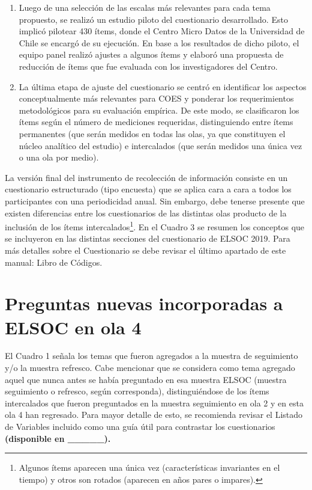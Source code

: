 \documentclass[
]{book}
\begin{document}
\begin{enumerate}
\def\labelenumi{\arabic{enumi}.}
\setcounter{enumi}{2}
\item
  Luego de una selección de las escalas más relevantes para cada tema propuesto, se realizó un estudio piloto del cuestionario desarrollado. Esto implicó pilotear 430 ítems, donde el Centro Micro Datos de la Universidad de Chile se encargó de su ejecución. En base a los resultados de dicho piloto, el equipo panel realizó ajustes a algunos ítems y elaboró una propuesta de reducción de ítems que fue evaluada con los investigadores del Centro.
\item
  La última etapa de ajuste del cuestionario se centró en identificar los aspectos conceptualmente más relevantes para COES y ponderar los requerimientos metodológicos para su evaluación empírica. De este modo, se clasificaron los ítems según el número de mediciones requeridas, distinguiendo entre ítems permanentes (que serán medidos en todas las olas, ya que constituyen el núcleo analítico del estudio) e intercalados (que serán medidos una única vez o una ola por medio).
\end{enumerate}

La versión final del instrumento de recolección de información consiste en un cuestionario estructurado (tipo encuesta) que se aplica cara a cara a todos los participantes con una periodicidad anual. Sin embargo, debe tenerse presente que existen diferencias entre los cuestionarios de las distintas olas producto de la inclusión de los ítems intercalados\footnote{Algunos ítems aparecen una única vez (características invariantes en el tiempo) y otros son rotados (aparecen
  en años pares o impares).}. En el Cuadro 3 se resumen los conceptos que se incluyeron en las distintas secciones del cuestionario de ELSOC 2019. Para más detalles sobre el Cuestionario se debe revisar el último apartado de este manual: Libro de Códigos.

\hypertarget{nueva-preg}{%
\section{Preguntas nuevas incorporadas a ELSOC en ola 4}\label{nueva-preg}}

El Cuadro 1 señala los temas que fueron agregados a la muestra de seguimiento y/o la muestra refresco. Cabe mencionar que se considera como tema agregado aquel que nunca antes se había preguntado en esa muestra ELSOC (muestra seguimiento o refresco, según corresponda), distinguiéndose de los ítems intercalados que fueron preguntados en la muestra seguimiento en ola 2 y en esta ola 4 han regresado. Para mayor detalle de esto, se recomienda revisar el Listado de Variables incluido como una guía útil para contrastar los cuestionarios \textbf{(disponible en \_\_\_\_\_).}
\end{document}
